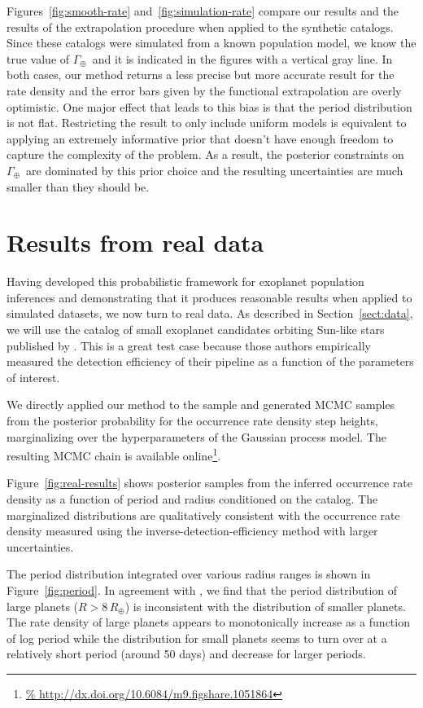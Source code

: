 \documentclass[12pt,preprint]{aastex}
\newcommand{\figref}[1]{\ref{fig:#1}}
\newcommand{\Fig}[1]{Figure~\figref{#1}}
\newcommand{\fig}[1]{\Fig{#1}}
\newcommand{\Sect}[1]{Section~\ref{sect:#1}}
\newcommand{\sect}[1]{\Sect{#1}}
\newcommand{\sectlabel}[1]{\label{sect:#1}}
\newcommand{\rate}{\ensuremath{\Gamma}}
\newcommand{\gammaearth}{{\ensuremath{\rate_\oplus}}}
\begin{document}
Figures~\figref{smooth-rate} and~\figref{simulation-rate} compare our results
and the results of the \citet{petigura} extrapolation procedure when applied
to the synthetic catalogs.
Since these catalogs were simulated from a known population model, we know the
true value of \gammaearth\ and it is indicated in the figures with a vertical
gray line.
In both cases, our method returns a less precise but more accurate result for
the rate density and the error bars given by the functional extrapolation
are overly optimistic.
One major effect that leads to this bias is that the period distribution is
not flat.
Restricting the result to only include uniform models is equivalent to
applying an extremely informative prior that doesn't have enough freedom to
capture the complexity of the problem.
As a result, the posterior constraints on \gammaearth\ are dominated by this
prior choice and the resulting uncertainties are much smaller than they should
be.

\section{Results from real data}
\sectlabel{real}

Having developed this probabilistic framework for exoplanet population
inferences and demonstrating that it produces reasonable results when applied
to simulated datasets, we now turn to real data.
As described in \sect{data}, we will use the catalog of small exoplanet
candidates orbiting Sun-like stars published by \citet{petigura}.
This is a great test case because those authors empirically measured the
detection efficiency of their pipeline as a function of the parameters of
interest.

We directly applied our method to the \citet{petigura} sample and generated
MCMC samples from the posterior probability for the occurrence rate density
step heights, marginalizing over the hyperparameters of the Gaussian process
model.
The resulting MCMC chain is available online\footnote{\url{%
http://dx.doi.org/10.6084/m9.figshare.1051864}}.

\Fig{real-results} shows posterior samples from the inferred occurrence rate
density as a function of period and radius conditioned on the catalog.
The marginalized distributions are qualitatively consistent with the
occurrence rate density measured using the inverse-detection-efficiency
method with larger uncertainties.

The period distribution integrated over various radius ranges is shown in
\fig{period}.
In agreement with \citet{dong}, we find that the period distribution of large
planets ($R > 8\,R_\oplus$) is inconsistent with the distribution of smaller
planets.
The rate density of large planets appears to monotonically increase as a
function of log period while the distribution for small planets seems to turn
over at a relatively short period (around 50 days) and decrease for larger
periods.
\end{document}
